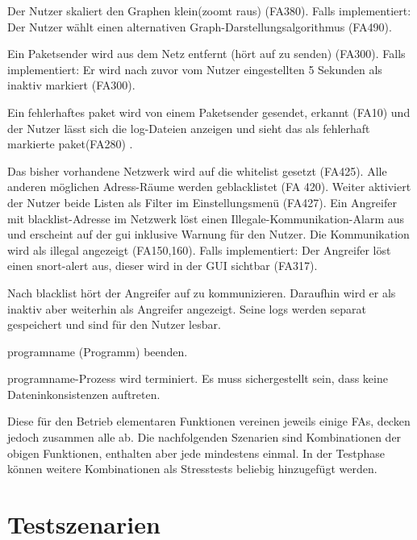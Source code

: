 \begin{description}[style=multiline, leftmargin=4cm, labelwidth=4cm]
  \item[\namedlabel{guiChanging}{Graph verändern}] Der Nutzer skaliert den Graphen klein(zoomt raus) (FA380). Falls implementiert: Der Nutzer wählt einen alternativen Graph-Darstellungsalgorithmus (FA490).
  \item[\namedlabel{inactive}{Netzteilnehmer wird inaktiv}] Ein Paketsender wird aus dem Netz entfernt (hört auf zu senden) (FA300). Falls implementiert: Er wird nach zuvor vom Nutzer eingestellten 5 Sekunden als inaktiv markiert (FA300).
  \item[\namedlabel{errpak}{Fehlerhaftes Paket}] Ein fehlerhaftes \gls{paket} wird von einem Paketsender gesendet, erkannt (FA10) und der Nutzer lässt sich die \gls{log}-Dateien anzeigen und sieht das als fehlerhaft markierte \gls{paket}(FA280) .
  \item[\namedlabel{blacklist}{Blacklist}] Das bisher vorhandene Netzwerk wird auf die \gls{whitelist} gesetzt (FA425). Alle anderen möglichen Adress-Räume werden geblacklistet (FA 420). Weiter aktiviert der Nutzer beide Listen als Filter im Einstellungsmenü (FA427). Ein Angreifer mit \gls{blacklist}-Adresse im Netzwerk löst einen Illegale-Kommunikation-Alarm aus und erscheint auf der \gls{gui} inklusive Warnung für den Nutzer. Die Kommunikation wird als illegal angezeigt (FA150,160). Falls implementiert: Der Angreifer löst einen \gls{snort}-\gls{alert} aus, dieser wird in der GUI sichtbar (FA317).
  \item[\namedlabel{inactiveBlacklist}{Inaktiver geblacklisteter Teilnehmer}] Nach \gls{blacklist} hört der Angreifer auf zu kommunizieren. Daraufhin wird er als inaktiv aber weiterhin als Angreifer angezeigt. Seine \glspl{log} werden separat gespeichert und sind für den Nutzer lesbar.
  \item[\namedlabel{Exit}{Exit}] \gls{programname} (Programm) beenden.
  \item[\namedlabel{Absturz}{Absturz}] \gls{programname}-Prozess wird terminiert. Es muss sichergestellt sein, dass keine Dateninkonsistenzen auftreten.
\end{description}
\par
Diese für den Betrieb elementaren Funktionen vereinen jeweils einige FAs, decken jedoch zusammen alle ab. Die nachfolgenden Szenarien sind Kombinationen der obigen Funktionen, enthalten aber jede mindestens einmal. In der Testphase können weitere Kombinationen als Stresstests beliebig hinzugefügt werden.

\section{Testszenarien}

